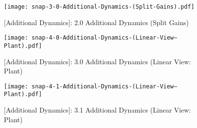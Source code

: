 \documentclass[crop=false,float=true,class=scrreprt]{standalone}
\begin{document}
\clearpage




\begin{landscape}
\begin{figure}[H]%
\centering%
\begin{minipage}[c][0.995\textheight][c]{0.995\linewidth}%
\centering%
\texttt{[image: snap-3-0-Additional-Dynamics-(Split-Gains).pdf]}%
\caption[{[Additional Dynamics]: 2.0 Additional Dynamics (Split Gains)}]%
        {{[Additional Dynamics]: 2.0 Additional Dynamics (Split Gains)%
          \label{FIG:controllerDesign:additionalDynamics:background:3p0:additionalDynamics:splitGains}%
        }}%
\end{minipage}%
\end{figure}
\end{landscape}




\clearpage




\begin{landscape}
\begin{figure}[H]%
\centering%
\begin{minipage}[c][0.995\textheight][c]{0.995\linewidth}%
\centering%
\texttt{[image: snap-4-0-Additional-Dynamics-(Linear-View---Plant).pdf]}%
\caption[{[Additional Dynamics]: 3.0 Additional Dynamics (Linear View: Plant)}]%
        {{[Additional Dynamics]: 3.0 Additional Dynamics (Linear View: Plant)%
          \label{FIG:controllerDesign:additionalDynamics:background:4p0:additionalDynamics:linearView:plant}%
        }}%
\end{minipage}%
\end{figure}
\end{landscape}




\clearpage




\begin{landscape}
\begin{figure}[H]%
\centering%
\begin{minipage}[c][0.995\textheight][c]{0.995\linewidth}%
\centering%
\texttt{[image: snap-4-1-Additional-Dynamics-(Linear-View---Plant).pdf]}%
\caption[{[Additional Dynamics]: 3.1 Additional Dynamics (Linear View: Plant)}]%
        {{[Additional Dynamics]: 3.1 Additional Dynamics (Linear View: Plant)%
          \label{FIG:controllerDesign:additionalDynamics:background:4p1:additionalDynamics:linearView:plant}%
        }}%
\end{minipage}%
\end{figure}
\end{landscape}
\end{document}
